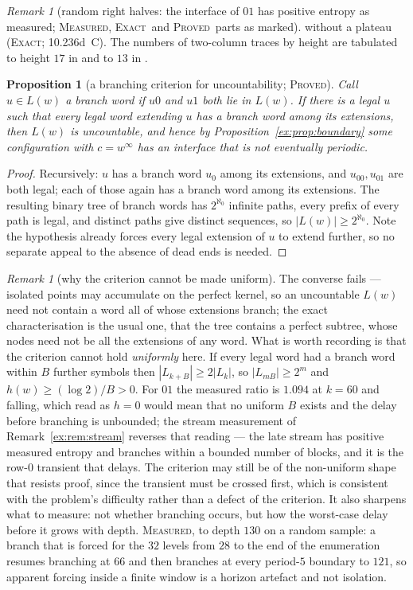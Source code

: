 \documentclass[11pt]{article}
\newtheorem{proposition}[theorem]{Proposition}
\theoremstyle{definition}
\theoremstyle{remark}
\newtheorem{remark}[theorem]{Remark}
\newcommand{\PROVED}{\textsc{Proved}}
\newcommand{\EXACT}{\textsc{Exact}}
\newcommand{\MEASURED}{\textsc{Measured}}
\begin{document}
\begin{remark}[random right halves: the interface of $01$ has positive entropy as measured; \MEASURED, \EXACT\ and \PROVED\ parts as marked]
without a plateau (\EXACT; 10.236d~C). The numbers of two-column traces by height are tabulated to height $17$ in \cite[p.~1087]{NKS} and to $13$ in \cite{Dib}.
\end{remark}

\begin{proposition}[a branching criterion for uncountability; \PROVED]\label{ex:prop:branching}
Call $u\in L(w)$ a \emph{branch word} if $u0$ and $u1$ both lie in $L(w)$. If there is a legal $u$
such that \emph{every} legal word extending $u$ has a branch word among its extensions, then $L(w)$ is
uncountable, and hence by Proposition~\ref{ex:prop:boundary} some configuration with $c=w^{\infty}$ has
an interface that is not eventually periodic.
\end{proposition}
\begin{proof}
Recursively: $u$ has a branch word $u_0$ among its extensions, and $u_00,u_01$ are both legal; each of
those again has a branch word among its extensions. The resulting binary tree of branch words has
$2^{\aleph_0}$ infinite paths, every prefix of every path is legal, and distinct paths give distinct
sequences, so $|L(w)|\ge2^{\aleph_0}$. Note the hypothesis already forces every legal extension of $u$
to extend further, so no separate appeal to the absence of dead ends is needed.
\end{proof}

\begin{remark}[why the criterion cannot be made uniform]\label{ex:rem:branching}
The converse fails --- isolated points may accumulate on the perfect kernel, so an uncountable $L(w)$
need not contain a word all of whose extensions branch; the exact characterisation is the usual one,
that the tree contains a perfect subtree, whose nodes need not be all the extensions of any word. What
is worth recording is that the criterion cannot hold \emph{uniformly} here. If every legal word had a
branch word within $B$ further symbols then $|L_{k+B}|\ge2|L_k|$, so $|L_{mB}|\ge2^m$ and
$h(w)\ge(\log2)/B>0$. For $01$ the measured ratio is $1.094$ at $k=60$ and falling, which read as
$h=0$ would mean that no uniform $B$ exists and the delay before branching is unbounded; the stream
measurement of Remark~\ref{ex:rem:stream} reverses that reading --- the late stream has positive measured
entropy and branches within a bounded number of blocks, and it is the row-$0$ transient that delays. The
criterion may still be of the non-uniform shape that resists proof, since the transient must be crossed
first, which is consistent with the problem's difficulty rather than a defect of the criterion. It also sharpens what to measure: not whether branching occurs, but how the
worst-case delay before it grows with depth. \MEASURED, to depth $130$ on a random sample: a branch
that is forced for the $32$ levels from $28$ to the end of the enumeration resumes branching at $66$
and then branches at every period-$5$ boundary to $121$, so apparent forcing inside a finite window is
a horizon artefact and not isolation.
\end{remark}
\end{document}
